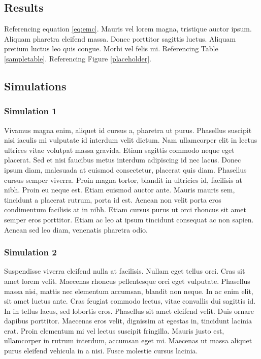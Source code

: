 \documentclass[draft,grl]{AGUTeX}
\begin{document}
\begin{article}

\section{Results}

Referencing equation \ref{eq:emc}. Mauris vel lorem magna, tristique auctor ipsum. Aliquam pharetra eleifend massa. Donec porttitor sagittis luctus. Aliquam pretium luctus leo quis congue. Morbi vel felis mi. Referencing Table \ref{sampletable}. Referencing Figure \ref{placeholder}.

\subsection{Simulations}

\subsubsection{Simulation 1}

Vivamus magna enim, aliquet id cursus a, pharetra ut purus. Phasellus suscipit nisi iaculis mi vulputate id interdum velit dictum. Nam ullamcorper elit in lectus ultrices vitae volutpat massa gravida. Etiam sagittis commodo neque eget placerat. Sed et nisi faucibus metus interdum adipiscing id nec lacus. Donec ipsum diam, malesuada at euismod consectetur, placerat quis diam. Phasellus cursus semper viverra. Proin magna tortor, blandit in ultricies id, facilisis at nibh. Proin eu neque est. Etiam euismod auctor ante. Mauris mauris sem, tincidunt a placerat rutrum, porta id est. Aenean non velit porta eros condimentum facilisis at in nibh. Etiam cursus purus ut orci rhoncus sit amet semper eros porttitor. Etiam ac leo at ipsum tincidunt consequat ac non sapien. Aenean sed leo diam, venenatis pharetra odio.

\subsubsection{Simulation 2}

Suspendisse viverra eleifend nulla at facilisis. Nullam eget tellus orci. Cras sit amet lorem velit. Maecenas rhoncus pellentesque orci eget vulputate. Phasellus massa nisi, mattis nec elementum accumsan, blandit non neque. In ac enim elit, sit amet luctus ante. Cras feugiat commodo lectus, vitae convallis dui sagittis id. In in tellus lacus, sed lobortis eros. Phasellus sit amet eleifend velit. Duis ornare dapibus porttitor. Maecenas eros velit, dignissim at egestas in, tincidunt lacinia erat. Proin elementum mi vel lectus suscipit fringilla. Mauris justo est, ullamcorper in rutrum interdum, accumsan eget mi. Maecenas ut massa aliquet purus eleifend vehicula in a nisi. Fusce molestie cursus lacinia.


\end{article}
\end{document}
